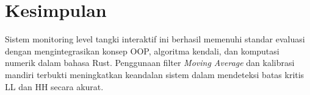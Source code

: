 \documentclass[12pt,a4paper]{article}
\begin{document}
\section{Kesimpulan}
Sistem monitoring level tangki interaktif ini berhasil memenuhi standar evaluasi dengan mengintegrasikan konsep OOP, algoritma kendali, dan komputasi numerik dalam bahasa Rust. Penggunaan filter \textit{Moving Average} dan kalibrasi mandiri terbukti meningkatkan keandalan sistem dalam mendeteksi batas kritis LL dan HH secara akurat.
\end{document}
